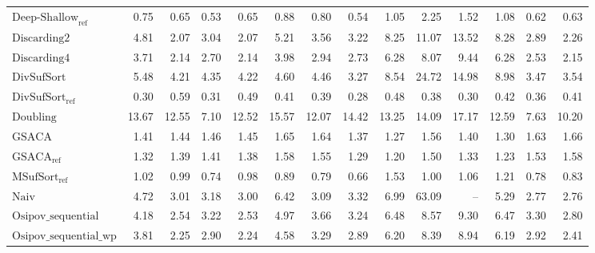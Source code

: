 \begin{table}[h]
{\begin{tabular}{lrrrrrrrrrrrrr}
    $\text{Deep-Shallow}_{\text{ref}}$ & 0.75 & {\color{green!60!black}0.65} & {\color{green!60!black}0.53} & {\color{green!60!black}0.65} & 0.88 & 0.80 & 0.54 & 1.05 & 2.25 & 1.52 & 1.08 & 0.62 & 0.63 \\
    $\text{Discarding2}$ & 4.81 & 2.07 & 3.04 & 2.07 & 5.21 & 3.56 & 3.22 & 8.25 & 11.07 & {\color{red}13.52} & {\color{red}8.28} & 2.89 & 2.26 \\
    $\text{Discarding4}$ & 3.71 & 2.14 & 2.70 & 2.14 & 3.98 & 2.94 & 2.73 & 6.28 & 8.07 & 9.44 & 6.28 & 2.53 & 2.15 \\
    $\text{DivSufSort}$ & 5.48 & 4.21 & 4.35 & 4.22 & 4.60 & 4.46 & 3.27 & 8.54 & {\color{red}24.72} & {\color{red}14.98} & {\color{red}8.98} & 3.47 & 3.54 \\
    $\text{DivSufSort}_{\text{ref}}$ & {\color{green!60!black}0.30} & {\color{green!60!black}0.59} & {\color{green!60!black}0.31} & {\color{green!60!black}0.49} & {\color{green!60!black}0.41} & {\color{green!60!black}0.39} & {\color{green!60!black}0.28} & {\color{green!60!black}0.48} & {\color{green!60!black}0.38} & {\color{green!60!black}0.30} & {\color{green!60!black}0.42} & {\color{green!60!black}0.36} & {\color{green!60!black}0.41} \\
    $\text{Doubling}$ & {\color{red}13.67} & {\color{red}12.55} & {\color{red}7.10} & {\color{red}12.52} & {\color{red}15.57} & {\color{red}12.07} & {\color{red}14.42} & {\color{red}13.25} & 14.09 & {\color{red}17.17} & {\color{red}12.59} & {\color{red}7.63} & {\color{red}10.20} \\
    $\text{GSACA}$ & 1.41 & 1.44 & 1.46 & 1.45 & 1.65 & 1.64 & 1.37 & 1.27 & 1.56 & 1.40 & 1.30 & 1.63 & 1.66 \\
    $\text{GSACA}_{\text{ref}}$ & 1.32 & 1.39 & 1.41 & 1.38 & 1.58 & 1.55 & 1.29 & 1.20 & 1.50 & 1.33 & 1.23 & 1.53 & 1.58 \\
    $\text{MSufSort}_{\text{ref}}$ & 1.02 & 0.99 & 0.74 & 0.98 & 0.89 & 0.79 & 0.66 & 1.53 & 1.00 & 1.06 & 1.21 & 0.78 & 0.83 \\
    $\text{Naiv}$ & 4.72 & 3.01 & 3.18 & 3.00 & 6.42 & 3.09 & 3.32 & 6.99 & {\color{red}63.09} & {\color{darkgray}--} & 5.29 & 2.77 & 2.76 \\
    $\text{Osipov\_sequential}$ & 4.18 & 2.54 & 3.22 & 2.53 & 4.97 & 3.66 & 3.24 & 6.48 & 8.57 & 9.30 & 6.47 & 3.30 & 2.80 \\
    $\text{Osipov\_sequential\_wp}$ & 3.81 & 2.25 & 2.90 & 2.24 & 4.58 & 3.29 & 2.89 & 6.20 & 8.39 & 8.94 & 6.19 & 2.92 & 2.41 \\

\end{tabular}}
\end{table}
